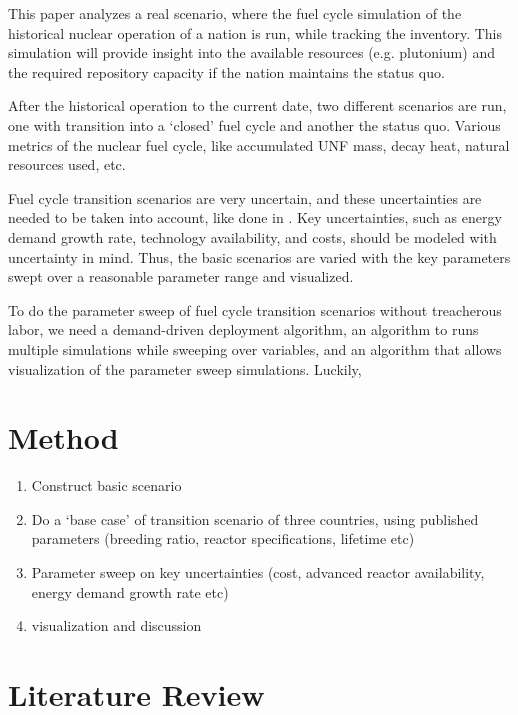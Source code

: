 \documentclass{article}
\begin{document}
This paper analyzes a real scenario, where the fuel cycle
simulation of the historical nuclear operation of a nation is run,
while tracking the inventory. This simulation will provide insight into
the available resources (e.g. plutonium) and the required repository
capacity if the nation maintains the status quo.

After the historical operation to the current date, two different 
scenarios are run, one with transition into a `closed' fuel cycle
and another the status quo. Various metrics of the nuclear fuel cycle,
like accumulated \gls{UNF} mass, decay heat, natural resources used, etc.

Fuel cycle transition scenarios are very uncertain, and these uncertainties
are needed to be taken into account, like done in \cite{nuclear_phathanapirom_2016}. Key uncertainties, such as energy demand growth
rate, technology availability, and costs, should be modeled with uncertainty
in mind. Thus, the basic scenarios are varied with the key parameters
swept over a reasonable parameter range and visualized. 

To do the parameter sweep of fuel cycle transition scenarios without
treacherous labor, we need a demand-driven deployment algorithm,
an algorithm to runs multiple simulations while sweeping over
variables, and an algorithm that allows visualization of 
the parameter sweep simulations. Luckily, 






\section{Method}

\begin{enumerate}
\item Construct basic scenario
\item Do a `base case' of transition scenario of three countries, using published parameters (breeding ratio, reactor specifications, lifetime etc)
\item Parameter sweep on key uncertainties (cost, advanced reactor availability,
energy demand growth rate etc)
\item visualization and discussion
\end{enumerate}


\section{Literature Review}
\end{document}
